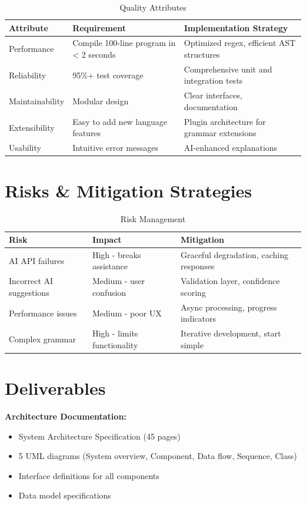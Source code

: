 \documentclass[a4paper,11pt]{article}
\begin{document}
\begin{table}[h]
\centering
\begin{tabularx}{\textwidth}{|l|X|X|}
\hline
\rowcolor{blue!10}
\textbf{Attribute} & \textbf{Requirement} & \textbf{Implementation Strategy} \\
\hline
Performance & Compile 100-line program in < 2 seconds & Optimized regex, efficient AST structures \\
\hline
Reliability & 95\%+ test coverage & Comprehensive unit and integration tests \\
\hline
Maintainability & Modular design & Clear interfaces, documentation \\
\hline
Extensibility & Easy to add new language features & Plugin architecture for grammar extensions \\
\hline
Usability & Intuitive error messages & AI-enhanced explanations \\
\hline
\end{tabularx}
\caption{Quality Attributes}
\end{table}

\section{Risks \& Mitigation Strategies}

\begin{table}[h]
\centering
\begin{tabularx}{\textwidth}{|l|X|X|}
\hline
\rowcolor{blue!10}
\textbf{Risk} & \textbf{Impact} & \textbf{Mitigation} \\
\hline
AI API failures & High - breaks assistance & Graceful degradation, caching responses \\
\hline
Incorrect AI suggestions & Medium - user confusion & Validation layer, confidence scoring \\
\hline
Performance issues & Medium - poor UX & Async processing, progress indicators \\
\hline
Complex grammar & High - limits functionality & Iterative development, start simple \\
\hline
\end{tabularx}
\caption{Risk Management}
\end{table}

\section{Deliverables}

\textbf{Architecture Documentation:}
\begin{itemize}[leftmargin=*]
    \item System Architecture Specification (45 pages)
    \item 5 UML diagrams (System overview, Component, Data flow, Sequence, Class)
    \item Interface definitions for all components
    \item Data model specifications
\end{itemize}
\end{document}
